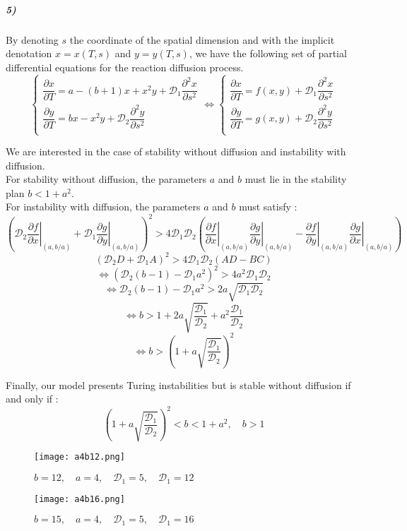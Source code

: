 \documentclass{article}
\begin{document}
\subparagraph{5)}
By denoting $s$ the coordinate of the spatial dimension and with the implicit denotation $x=x(T,s)$ and $y=y(T,s)$, we have the following set of partial differential equations for the reaction diffusion process.
\renewcommand{\arraystretch}{2.5} 
$$ \displaystyle 
   \left \{
    \begin{array}{l}
        \dfrac{\partial x}{\partial T}= a-(b+1)x +x^2 y + \mathcal{D}_1 \dfrac{\partial^2 x}{\partial s^2} \\
		\dfrac{\partial y}{\partial T}=b x -x^2 y + \mathcal{D}_2\dfrac{\partial^2 y}{\partial s^2} \\
    \end{array}
\right.
\iff
\left \{
    \begin{array}{l}
        \dfrac{\partial x}{\partial T}= f(x,y) + \mathcal{D}_1 \dfrac{\partial^2 x}{\partial s^2} \\
		\dfrac{\partial y}{\partial T}=g(x,y) + \mathcal{D}_2\dfrac{\partial^2 y}{\partial s^2} \\
    \end{array}
\right.
 $$

We are interested in the case of stability without diffusion and instability with diffusion. \\

For stability without diffusion, the parameters $a$ and $b$ must lie in the stability plan $b < 1+a^2$. \\

For instability with diffusion, the parameters $a$ and $b$ must satisfy : 
$$ \left(\mathcal{D}_2 \left. \dfrac{\partial f}{\partial x}\right|_{(a,b/a)}+ \mathcal{D}_1 \left. \dfrac{\partial g}{\partial y}\right|_{(a,b/a)} \right)^2 >4 \mathcal{D}_1 \mathcal{D}_2 \left( \left. \dfrac{\partial f}{\partial x}\right|_{(a,b/a)}\left. \dfrac{\partial g}{\partial y}\right|_{(a,b/a)}-\left. \dfrac{\partial f}{\partial y}\right|_{(a,b/a)}\left. \dfrac{\partial g}{\partial x}\right|_{(a,b/a)} \right)$$
$$ \left(\mathcal{D}_2 D+ \mathcal{D}_1 A \right)^2 >4 \mathcal{D}_1 \mathcal{D}_2 (  AD-BC)$$
$$ \iff (\mathcal{D}_2(b-1) - \mathcal{D}_1 a^2 )^2 >4 a^2 \mathcal{D}_1 \mathcal{D}_2 $$
$$ \iff \mathcal{D}_2(b-1) - \mathcal{D}_1 a^2 >2 a \sqrt{\mathcal{D}_1 \mathcal{D}_2} $$
$$ \iff b >1+2 a\sqrt{\dfrac{\mathcal{D}_1}{\mathcal{D}_2}}+a^2 \dfrac{\mathcal{D}_1}{\mathcal{D}_2} $$
$$ \iff b > \left( 1+a\sqrt{\dfrac{\mathcal{D}_1}{\mathcal{D}_2}} \right)^2 $$

Finally, our model presents Turing instabilities but is stable without diffusion if and only if  : 
$$  \left( 1+a\sqrt{\dfrac{\mathcal{D}_1}{\mathcal{D}_2}} \right)^2 < b < 1+a^2, \quad b>1$$

	\begin{figure}[H]
	  \centering
  	\texttt{[image: a4b12.png]}
  	\caption{$b=12, \quad a=4, \quad \mathcal{D}_1=5, \quad  \mathcal{D}_1=12 $}
	\end{figure}

	\begin{figure}[H]
	  \centering
  	\texttt{[image: a4b16.png]}
  	\caption{$b=15, \quad a=4, \quad \mathcal{D}_1=5, \quad \mathcal{D}_1=16 $}
	\end{figure}
\end{document}
